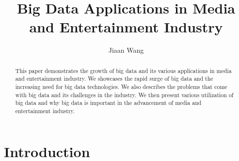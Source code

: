 \documentclass[sigconf]{acmart}
\begin{document}
\title{Big Data Applications in Media and Entertainment Industry}


\author{Jiaan Wang}


\begin{abstract}

    This paper demonstrates the growth of big data and its various applications in media and entertainment industry. We showcases the rapid surge of big data and the increasing need for big data technologies. We also describes the problems that come with big data and its challenges in the industry. We then present various utilization of big data and why big data is important in the advancement of media and entertainment industry. 
    
\end{abstract}


\maketitle

\section{Introduction}
\end{document}
